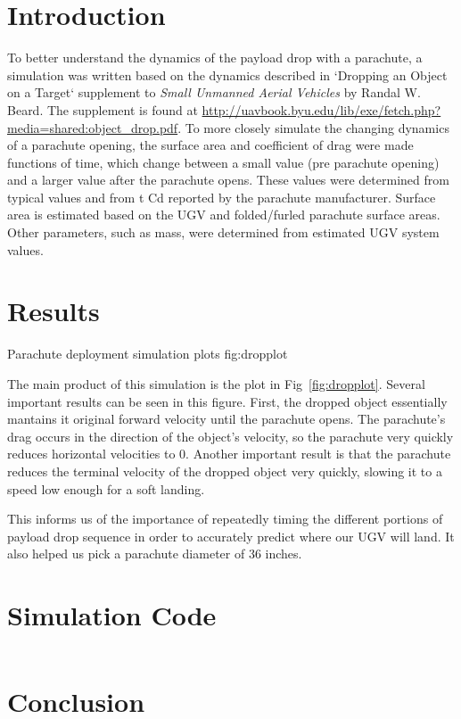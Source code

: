 \documentclass[]{auvsi_doc}
\begin{document}
\begin{AUVSITitlePage}
\begin{artifacttable} 
\end{artifacttable}
\end{AUVSITitlePage}


\section*{Introduction}
To better understand the dynamics of the payload drop with a parachute, a simulation was written based on the dynamics described in `Dropping an Object on a Target` supplement to \textit{Small Unmanned Aerial Vehicles} by Randal W. Beard.
The supplement is found at \url{http://uavbook.byu.edu/lib/exe/fetch.php?media=shared:object_drop.pdf}. 
To more closely simulate the changing dynamics of a parachute opening, the surface area and coefficient of drag were made functions of time, which change between a small value (pre parachute opening) and a larger value after the parachute opens. These values were determined from typical values and from t Cd reported by the parachute manufacturer. Surface area is estimated based on the UGV and folded/furled parachute surface areas. Other parameters, such as mass, were determined from estimated UGV system values.

\section*{Results}
{\textwidth}
{Parachute deployment simulation plots}
{fig:dropplot}

The main product of this simulation is the plot in Fig~\ref{fig:dropplot}. Several important results can be seen in this figure. First, the dropped object essentially mantains it original forward velocity until the parachute opens. The parachute's drag occurs in the direction of the object's velocity, so the parachute very quickly reduces horizontal velocities to 0. 
Another important result is that the parachute reduces the terminal velocity of the dropped object very quickly, slowing it to a speed low enough for a soft landing.

This informs us of the importance of repeatedly timing the different portions of payload drop sequence in order to accurately predict where our UGV will land. It also helped us pick a parachute diameter of 36 inches.

\section*{Simulation Code}
\inputminted[fontsize=\footnotesize]{python}{drop.py}
\section*{Conclusion}
\end{document}
